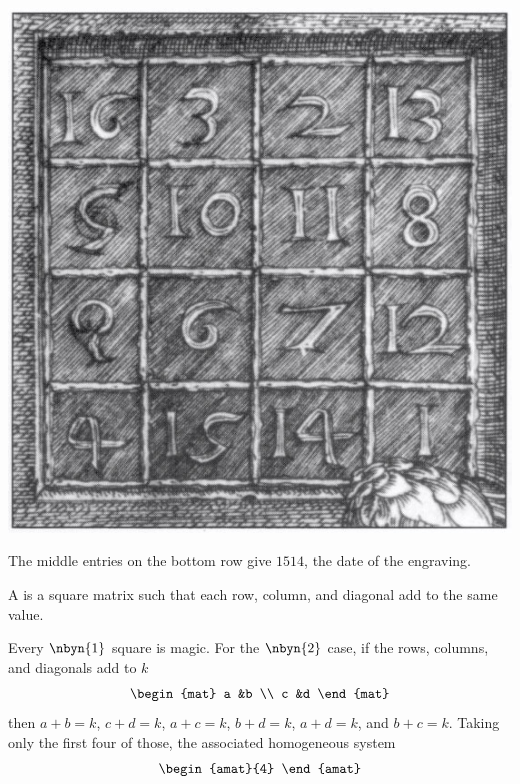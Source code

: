 \begin{center}
  \includegraphics{Melencoliadetail.jpg} %
\end{center}
The middle entries on the bottom row give $1514$, the 
date of the engraving.

A 
is a square matrix such that each row, column, and diagonal add to the same
value.

Every $\nbyn{1}$ square is magic.
For the $\nbyn{2}$ case, if the rows, columns, and diagonals add to $k$
\begin{equation*}
  \begin{mat}
    a  &b  \\
    c  &d
  \end{mat}
\end{equation*}
then $a+b=k$, $c+d=k$, $a+c=k$, $b+d=k$, $a+d=k$, and $b+c=k$.
Taking only the first four of those, the associated homogeneous system
\begin{equation*}
  \begin{amat}{4}
        
  \end{amat}
\end{equation*}




